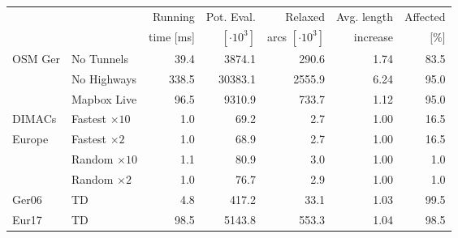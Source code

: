 \begin{tabular}{llrrrrr}
\toprule
        &                     &   Running &     Pot. Eval. &             Relaxed & Avg. length & Affected \\
        &                     & time [ms] & $[\cdot 10^3]$ & arcs $[\cdot 10^3]$ &    increase &     [\%] \\
\midrule
OSM Ger & No Tunnels          &      39.4 &         3874.1 &               290.6 &        1.74 &     83.5 \\
        & No Highways         &     338.5 &        30383.1 &              2555.9 &        6.24 &     95.0 \\
        & Mapbox Live         &      96.5 &         9310.9 &               733.7 &        1.12 &     95.0 \\
\addlinespace
DIMACs  & Fastest $\times 10$ &       1.0 &           69.2 &                 2.7 &        1.00 &     16.5 \\
Europe  & Fastest $\times 2$  &       1.0 &           68.9 &                 2.7 &        1.00 &     16.5 \\
        & Random $\times 10$  &       1.1 &           80.9 &                 3.0 &        1.00 &      1.0 \\
        & Random $\times 2$   &       1.0 &           76.7 &                 2.9 &        1.00 &      1.0 \\
\addlinespace
Ger06   & TD                  &       4.8 &          417.2 &                33.1 &        1.03 &     99.5 \\
Eur17   & TD                  &      98.5 &         5143.8 &               553.3 &        1.04 &     98.5 \\
\bottomrule
\end{tabular}
